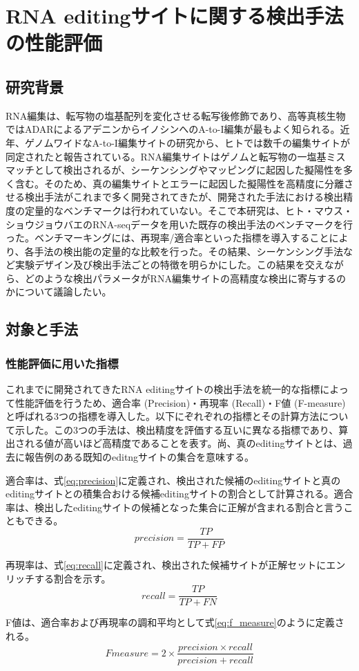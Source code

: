 \chapter{RNA editingサイトに関する検出手法の性能評価}

\section{研究背景}
RNA編集は、転写物の塩基配列を変化させる転写後修飾であり、高等真核生物ではADARによるアデニンからイノシンへのA-to-I編集が最もよく知られる。近年、ゲノムワイドなA-to-I編集サイトの研究から、ヒトでは数千の編集サイトが同定されたと報告されている。RNA編集サイトはゲノムと転写物の一塩基ミスマッチとして検出されるが、シーケンシングやマッピングに起因した擬陽性を多く含む。そのため、真の編集サイトとエラーに起因した擬陽性を高精度に分離させる検出手法がこれまで多く開発されてきたが、開発された手法における検出精度の定量的なベンチマークは行われていない。そこで本研究は、ヒト・マウス・ショウジョウバエのRNA-seqデータを用いた既存の検出手法のベンチマークを行った。ベンチマーキングには、再現率/適合率といった指標を導入することにより、各手法の検出能の定量的な比較を行った。その結果、シーケンシング手法など実験デザイン及び検出手法ごとの特徴を明らかにした。この結果を交えながら、どのような検出パラメータがRNA編集サイトの高精度な検出に寄与するのかについて議論したい。

\section{対象と手法}
\subsection{性能評価に用いた指標}
これまでに開発されてきたRNA editingサイトの検出手法を統一的な指標によって性能評価を行うため、適合率 (Precision)・再現率 (Recall)・F値 (F-measure)と呼ばれる3つの指標を導入した。以下にぞれぞれの指標とその計算方法について示した。この3つの手法は、検出精度を評価する互いに異なる指標であり、算出される値が高いほど高精度であることを表す。尚、真のeditingサイトとは、過去に報告例のある既知のeditngサイトの集合を意味する。
\par
適合率は、式\ref{eq:precision}に定義され、検出された候補のeditingサイトと真のeditingサイトとの積集合おける候補editingサイトの割合として計算される。適合率は、検出したeditingサイトの候補となった集合に正解が含まれる割合と言うこともできる。
\begin{equation}
	precision = \frac{TP}{TP+FP}
	\label{eq:precision}
\end{equation}
\par
再現率は、式\ref{eq:recall}に定義され、検出された候補サイトが正解セットにエンリッチする割合を示す。
\begin{equation}
	recall = \frac{TP}{TP+FN}
	\label{eq:recall}
\end{equation}
\par
F値は、適合率および再現率の調和平均として式\ref{eq:f_measure}のように定義される。
\begin{equation}
	Fmeasure = 2 \times \frac{precision \times recall}{precision + recall}
	\label{eq:f_measure}
\end{equation}

